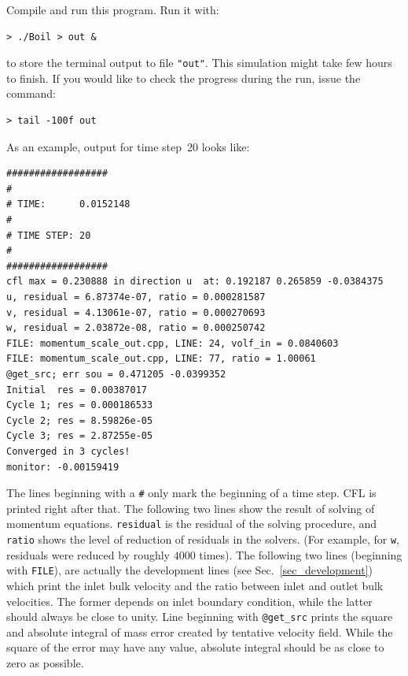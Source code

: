 Compile and run this program. Run it with:
%
\begin{verbatim}
> ./Boil > out &
\end{verbatim}
%
to store the terminal output to file {\tt "out"}. This simulation might take few hours
to finish. If you would like to check the progress during the run, issue the
command:
%
\begin{verbatim}
> tail -100f out
\end{verbatim}
%
As an example, output for time step~20 looks like:
%
{\small \begin{verbatim}
##################
#
# TIME:      0.0152148
#
# TIME STEP: 20
#
##################
cfl max = 0.230888 in direction u  at: 0.192187 0.265859 -0.0384375
u, residual = 6.87374e-07, ratio = 0.000281587
v, residual = 4.13061e-07, ratio = 0.000270693
w, residual = 2.03872e-08, ratio = 0.000250742
FILE: momentum_scale_out.cpp, LINE: 24, volf_in = 0.0840603
FILE: momentum_scale_out.cpp, LINE: 77, ratio = 1.00061
@get_src; err sou = 0.471205 -0.0399352
Initial  res = 0.00387017
Cycle 1; res = 0.000186533
Cycle 2; res = 8.59826e-05
Cycle 3; res = 2.87255e-05
Converged in 3 cycles!
monitor: -0.00159419
\end{verbatim}}
%
The lines beginning with a {\tt \#} only mark the beginning of a time step.
CFL is printed right after that. The following two lines show the result
of solving of momentum equations. {\tt residual} is the residual of 
the solving procedure, and {\tt ratio} shows the level of reduction of
residuals in the solvers. (For example, for {\tt w}, residuals were
reduced by roughly $4000$ times).
%
The following two lines (beginning with {\tt FILE}), are actually the
development lines (see Sec.~\ref{sec_development}) which print the inlet bulk
velocity and the ratio between inlet and outlet bulk velocities. The former
depends on inlet boundary condition, while the latter should always be
close to unity. 
%
Line beginning with {\tt @get\_src} prints the square and absolute integral
of mass error created by tentative velocity field. While the square of the
error may have any value, absolute integral should be as close to zero as
possible. 

